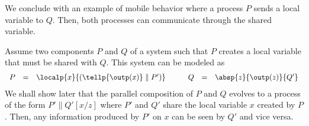 \documentclass{tlp}
\begin{document}
We conclude  with an example of mobile behavior where  a process $P$ sends a local variable to  $Q$. Then,  both
processes can communicate through the shared variable. 

\begin{example}\label{ex:mobility}
Assume two components  $P$ and $Q$ of a system such that $P$ creates
a local variable that must be shared with $Q$. This system can be modeled
as
\[
\begin{array}{lll l lll}
P & = & \localp{x}{(\tellp{\outp(x)} \parallel P')}  & \quad & 
Q & = &  \absp{z}{\outp(z)}{Q'}
\end{array}
\]
We shall show later that the parallel composition of
$P$ and $Q$ evolves to a process of the form
$
P' \parallel Q'[x/z]
$ where $P'$ and $Q'$ share the local variable $x$ created by $P$.
Then, any information produced by $P'$ on $x$ can be seen by $Q'$ and
vice versa. 
\end{example}
\end{document}
